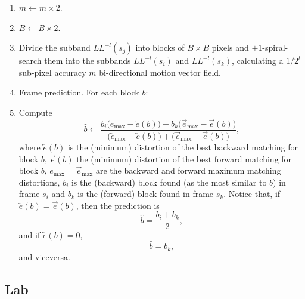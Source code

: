 {\begin{enumerate}
\begin{enumerate}

\item
  \(m\leftarrow m\times 2\).

  
\item
  \(B\leftarrow B\times 2\).

\item
  Divide the subband \(LL^{-l}(s_j)\) into blocks of \(B\times B\)
  pixels and \(\pm 1\)-spiral-search them into the subbands
  \(LL^{-l}(s_i)\) and \(LL^{-l}(s_k)\), calculating a \(1/2^l\)
  sub-pixel accuracy \(m\) bi-directional motion vector field. 
  
\item
  Frame prediction. For each block \(b\):
\item
  Compute \begin{equation}
   \hat{b}\leftarrow \frac{b_i\big(\overleftarrow{e}_\text{max}-\overleftarrow{e}(b)\big) + b_k\big(\overrightarrow{e}_\text{max}-\overrightarrow{e}(b)\big)}{\big(\overleftarrow{e}_\text{max}-\overleftarrow{e}(b)\big) + \big(\overrightarrow{e}_\text{max}-\overrightarrow{e}(b)\big)},
      \end{equation} where \(\overleftarrow{e}(b)\) is the (minimum)
  distortion of the best backward matching for block \(b\),
  \(\overrightarrow{e}(b)\) the (minimum) distortion of the best forward
  matching for block \(b\),
  \(\overleftarrow{e}_\text{max}=\overrightarrow{e}_\text{max}\) are the
  backward and forward maximum matching distortions, \(b_i\) is the
  (backward) block found (as the most similar to \(b\)) in frame \(s_i\)
  and \(b_k\) is the (forward) block found in frame \(s_k\). Notice
  that, if \(\overleftarrow{e}(b)=\overrightarrow{e}(b)\), then the
  prediction is \begin{equation}
   \hat{b} = \frac{b_i + b_k}{2},
      \end{equation} and if \(\overleftarrow{e}(b)=0\), \begin{equation}
   \hat{b} = b_k,
      \end{equation} and viceversa.
\end{enumerate}

    \hypertarget{lab}{%
\subsection{Lab}\label{lab}}


\end{enumerate}}
